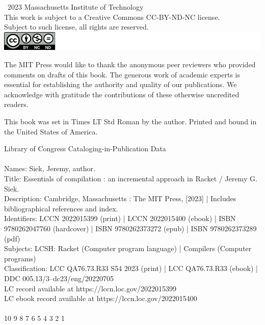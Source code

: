 \documentclass[7x10]{TimesAPriori_MIT}%
\numberwithin{theorem}{chapter}
\numberwithin{definition}{chapter}
\numberwithin{equation}{chapter}
\begin{document}
\begin{copyrightpage}
  \textcopyright\ 2023 Massachusetts Institute of Technology \\[2ex]
  This work is subject to a Creative Commons CC-BY-ND-NC license. \\[2ex]
  Subject to such license, all rights are reserved. \\[2ex]
  \includegraphics{CCBY-logo}

The MIT Press would like to thank the anonymous peer reviewers who
provided comments on drafts of this book. The generous work of
academic experts is essential for establishing the authority and
quality of our publications. We acknowledge with gratitude the
contributions of these otherwise uncredited readers.

This book was set in Times LT Std Roman by the author. Printed and
bound in the United States of America.

Library of Congress Cataloging-in-Publication Data\\
\ \\
Names: Siek, Jeremy, author.  \\
Title: Essentials of compilation : an incremental approach in Racket / Jeremy G. Siek.  \\
Description: Cambridge, Massachusetts : The MIT Press, [2023] | Includes bibliographical references and index. \\
Identifiers: LCCN 2022015399 (print) | LCCN 2022015400 (ebook) | ISBN 9780262047760 (hardcover) | ISBN 9780262373272 (epub) | ISBN 9780262373289 (pdf)  \\
Subjects: LCSH: Racket (Computer program language) | Compilers (Computer programs) \\
Classification: LCC QA76.73.R33 S54 2023  (print) | LCC QA76.73.R33 (ebook) | DDC 005.13/3--dc23/eng/20220705 \\
LC record available at https://lccn.loc.gov/2022015399\\
LC ebook record available at https://lccn.loc.gov/2022015400\\
\ \\

10 9 8 7 6 5 4 3 2 1

  

\end{copyrightpage}
\end{document}
